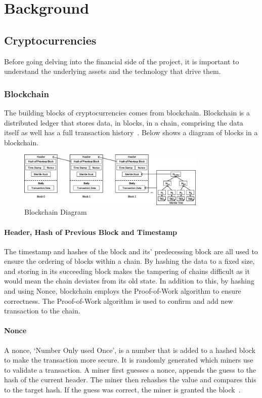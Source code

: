 \chapter{Background}

\section{Cryptocurrencies}
Before going delving into the financial side of the project, it is important to understand the underlying assets and the technology that drive them.

\subsection{Blockchain}
The building blocks of cryptocurrencies comes from blockchain. Blockchain is a distributed ledger that stores data, in blocks, in a chain, comprising the data itself as well has a full transaction history~\cite{nofer2017blockchain}. Below shows a diagram of blocks in a blockchain.

\begin{figure}[!htb]
    \centering
    \includegraphics[width=0.8\textwidth]{background/Images/The-structure-of-a-Blockchain.png}
    \caption{Blockchain Diagram~\cite{inbookBlockchain}}
\end{figure}

\subsubsection{Header, Hash of Previous Block and Timestamp}
The timestamp and hashes of the block and its' predecessing block are all used to ensure the ordering of blocks within a chain. By hashing the data to a fixed size, and storing in its succeeding block makes the tampering of chains difficult as it would mean the chain deviates from its old state. In addition to this, by hashing and using Nonce, blockchain employs the Proof-of-Work algorithm to ensure correctness. The Proof-of-Work algorithm is used to confirm and add new transaction to the chain.

\subsubsection{Nonce}
A nonce, `Number Only used Once', is a number that is added to a hashed block to make the transaction more secure. It is randomly generated which miners use to validate a transaction. A miner first guesses a nonce, appends the guess to the hash of the current header. The miner then rehashes the value and compares this to the target hash. If the guess was correct, the miner is granted the block~\cite{noauthor_components_2021}.

